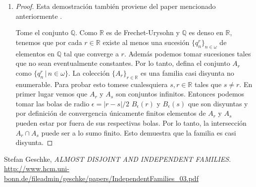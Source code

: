 \documentclass[letter,twoside,12pt]{article}
\begin{document}
\begin{enumerate}
\begin{proof}
Ahora para verificar que tiene al menos un elemento necesitamos encontrar al menos un conjunto finito $ A $ tal que $ A \cap (-\infty,s] $ es par y $ A \cap (-\infty,t] $ es impar para todo $ s \in S $ y todo $ t \in T $.

Este conjunto $ A $ lo podemos construir algoritmicamente. Tome $ (q_n)_{n\in N} $ donde $ N =\{1,\cdots, |S|+|T|\}$ una enumeración de los elementos de $ S \cup T $ ordenada.
Es decir que $ q_i < q_{i+1}$. Ahora sea $ q_i $ el mínimo $ i $ tal que $ q_i \in T$, entonces si $ i=1 $ tome cualquier $ p_0 \in \mathbb{Q} $ tal que $ p_0 \in (-\infty, q_0) $ si $ i \not = 1 $ tome $ p_0 \in \mathbb{Q}$ tal que $ p_0 \in (q_{i-1},q_i) $ y entonces $ A = A'\cup\{q\} $. Ahora buscamos el siguiente $ q_k $ tal que $ q_k \in S $, y tomamos $ p_1 $ un racional que este en $ (q_{k-1},q_{k}) $. Este proceso termina en algún punto porque $ N $ es finito y al final $ A = \{b_1,\cdots b_k\}$ es el conjunto buscado.

A partir de este $A$ podemos concluir que hay infinitos conjuntos que cumplen la propiedad. Por ejemplo, podemos ver que si agregamos racionales mayores que $ q_{|S|+|T|} $ estos conjuntos respetan la paridad establecida. Por lo tanto, los $ A_r $ son una familia independiente no contable. 
\end{proof}  

Muestre que existe una familia $ \mathcal{A} \subseteq \mathcal{P}(\mathbb{N}) $ no enumerable y \textit{casi disyunta} (i.e. $ A \cap B $ es finito para cualesquiera $ A,B \in \mathcal{A} $). 
\item \begin{proof}

Esta demostración también proviene del paper mencionado anteriormente \cite{stefan}.

Tome el conjunto $ \mathbb{Q} $. Como $ \mathbb{R} $ es de Frechet-Urysohn y $ \mathbb{Q} $ es denso en $ \mathbb{R} $, tenemos que por cada $ r \in \mathbb{R} $ existe al menos una sucesión $ \{q_n^r\}_{n \in \omega} $ de elementos en $ \mathbb{Q} $ tal que converge a $ r $. Además podemos tomar sucesiones tales que no sean eventualmente constantes. Por lo tanto, defina el conjunto $ A_r $ como $ \{q_n^r\,|\,n \in \omega\} $. La colección $ \{A_r\}_{r \in \mathbb{R}} $ es una familia casi disyunta no enumerable. Para probar esto tomese cualesquiera $ s,r \in \mathbb{R} $ tales que $ s \not = r $. En primer lugar vemos que $ A_r $ y $ A_s $ son conjuntos infinitos. Entonces podemos tomar las bolas de radio $ \epsilon = |r-s|/2$ $ B_\epsilon(r) $ y $ B_\epsilon(s) $ que son disyuntas y por definición de convergencia únicamente finitos elementos de $ A_r $ y $ A_s $ pueden estar por fuera de sus respectivas bolas. Por lo tanto, la intersección $ A_r \cap  A_s$ puede ser a lo sumo finito. Esto demuestra que la familia es casi disyunta.

\end{proof}

\end{enumerate}
\begin{thebibliography}{9}

  Stefan Geschke,
  \emph{ALMOST DISJOINT AND INDEPENDENT FAMILIES}. 
  \url{http://www.hcm.uni-bonn.de/fileadmin/geschke/papers/IndependentFamilies_03.pdf}

\end{thebibliography}
\end{document}
